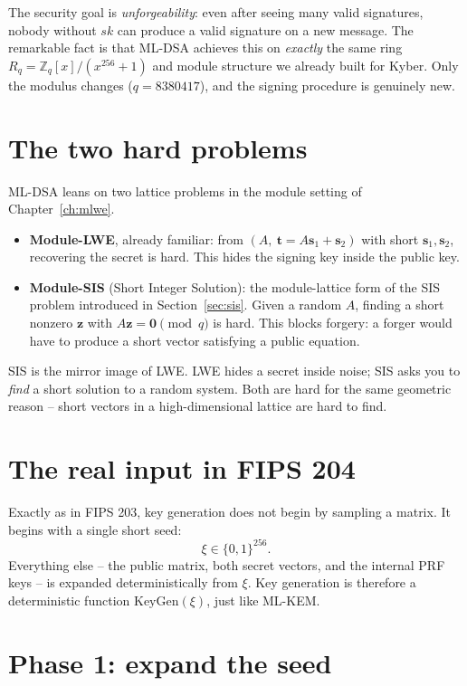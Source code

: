 The security goal is \emph{unforgeability}: even after seeing many valid signatures, nobody without $sk$ can produce a valid signature on a new message. The remarkable fact is that ML-DSA achieves this on \emph{exactly} the same ring $R_q = \mathbb{Z}_q[x]/(x^{256}+1)$ and module structure we already built for Kyber. Only the modulus changes ($q = 8380417$), and the signing procedure is genuinely new.

\section{The two hard problems}

ML-DSA leans on two lattice problems in the module setting of Chapter~\ref{ch:mlwe}.

\begin{itemize}
  \item \textbf{Module-LWE}, already familiar: from $(A,\ \mathbf{t}=A\mathbf{s}_1+\mathbf{s}_2)$ with short $\mathbf{s}_1,\mathbf{s}_2$, recovering the secret is hard. This hides the signing key inside the public key.
  \item \textbf{Module-SIS} (Short Integer Solution): the module-lattice form of the SIS problem introduced in Section~\ref{sec:sis}. Given a random $A$, finding a short nonzero $\mathbf{z}$ with $A\mathbf{z}=\mathbf{0}\pmod q$ is hard. This blocks forgery: a forger would have to produce a short vector satisfying a public equation.
\end{itemize}

SIS is the mirror image of LWE. LWE hides a secret inside noise; SIS asks you to \emph{find} a short solution to a random system. Both are hard for the same geometric reason -- short vectors in a high-dimensional lattice are hard to find.

\section{The real input in FIPS 204}

Exactly as in FIPS 203, key generation does not begin by sampling a matrix. It begins with a single short seed:
\[
\xi \in \{0,1\}^{256}.
\]
Everything else -- the public matrix, both secret vectors, and the internal PRF keys -- is expanded deterministically from $\xi$. Key generation is therefore a deterministic function $\mathrm{KeyGen}(\xi)$, just like ML-KEM.

\section{Phase 1: expand the seed}

